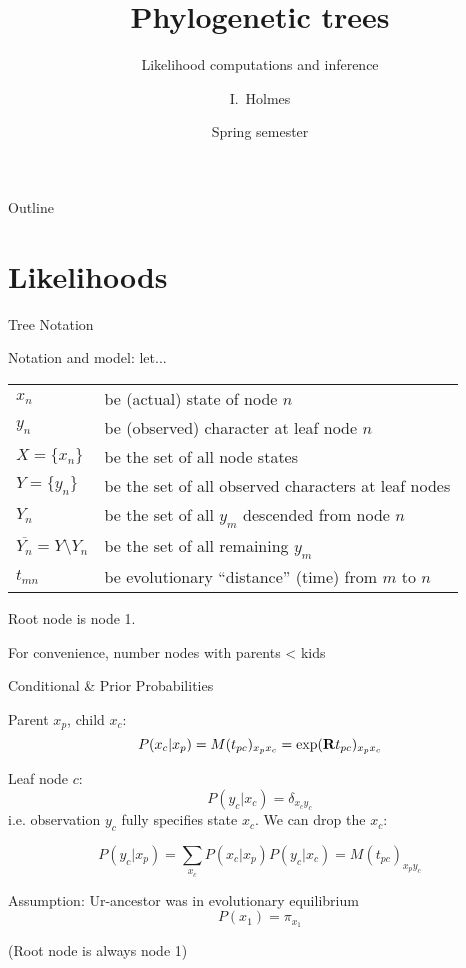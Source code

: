 \documentclass{beamer}
\title[Trees] %
{Phylogenetic trees}
\subtitle
{Likelihood computations and inference} %
\author%
{I.~Holmes} %
\institute[University of California, Berkeley] %
{
  Department of Bioengineering\\
  University of California, Berkeley}
\date%
{Spring semester}
\begin{document}
\begin{frame}
  \titlepage
\end{frame}

\begin{frame}{Outline}
  \tableofcontents
\end{frame}


\section{Likelihoods}

\newcommand\rootpi{\pi_{x_1}}
\newcommand\mxx[2]{M(t_{#1#2})_{x_{#1} x_{#2}}}
\newcommand\mxy[2]{M(t_{#1#2})_{x_{#1} y_{#2}}}
\newcommand\xydelta[1]{\delta_{x_{#1} y_{#1}}}

\begin{frame}{Tree Notation}

Notation and model: let...
\vspace{\baselineskip}

\begin{tabular}{ll}
 $x_n$ & be (actual) state of node $n$ \\
 $y_n$ & be (observed) character at leaf node $n$ \\
 $X = \{x_n\}$ & be the set of all node states \\
 $Y = \{ y_n \}$ & be the set of all observed characters at leaf nodes \\
 $Y_n$ & be the set of all $y_m$ descended from node $n$ \\
 $\overline{Y_n} = Y \setminus Y_n$ & be the set of all remaining $y_m$ \\
 $t_{mn}$ & be evolutionary ``distance'' (time) from $m$ to $n$
\end{tabular}

\vspace{\baselineskip}
Root node is node 1.

For convenience, number nodes with parents < kids

\end{frame}

\begin{frame}{Conditional \& Prior Probabilities}

Parent $x_p$, child $x_c$:
\[
P(x_c|x_p) = \mxx{p}{c} = \exp({\bf R}t_{pc})_{x_p x_c}
\]

Leaf node $c$:
\[
P(y_c|x_c) = \delta_{x_c y_c}
\]
i.e. observation $y_c$ fully specifies state $x_c$.
We can drop the $x_c$:

\[
P(y_c|x_p) = \sum_{x_c} P(x_c|x_p) P(y_c|x_c) = \mxy{p}{c}
\]

Assumption: Ur-ancestor was in evolutionary equilibrium
\[
P(x_1) = \pi_{x_1}
\]

(Root node is always node 1)

\end{frame}
\end{document}
